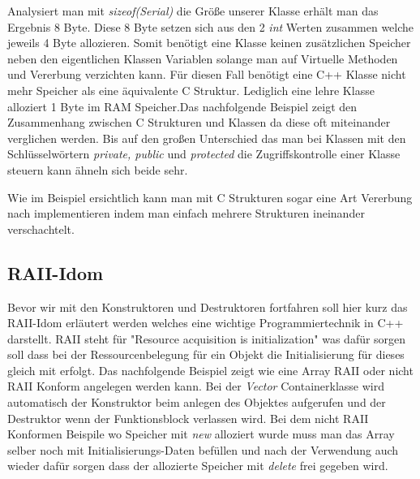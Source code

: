 \documentclass[MES,Master,ngerman]{twbook}%
\begin{document}
Analysiert man mit \textit{sizeof(Serial)} die Größe unserer Klasse erhält man das Ergebnis 8 Byte. Diese 8 Byte setzen sich aus den 2 \textit{int} Werten zusammen welche jeweils 4 Byte allozieren. Somit benötigt eine Klasse keinen zusätzlichen Speicher neben den eigentlichen Klassen Variablen solange man auf Virtuelle Methoden und Vererbung verzichten kann. Für diesen Fall benötigt eine C++ Klasse nicht mehr Speicher als eine äquivalente C Struktur. Lediglich eine lehre Klasse alloziert 1 Byte im RAM Speicher.\newpage Das nachfolgende Beispiel zeigt den Zusammenhang zwischen C Strukturen und Klassen da diese oft miteinander verglichen werden. Bis auf den großen Unterschied das man bei Klassen mit den Schlüsselwörtern \textit{private, public} und \textit{protected} die Zugriffskontrolle einer Klasse steuern kann ähneln sich beide sehr.

\begin{figure}[!htb]
	\begin{subfigure}[b]{0.5\textwidth}
		
		\label{fig:21}
	\end{subfigure}
	\begin{subfigure}[b]{0.5\textwidth}
		
		\label{fig:22}
	\end{subfigure}
\end{figure}

Wie im Beispiel ersichtlich kann man mit C Strukturen sogar eine Art Vererbung nach implementieren indem man einfach mehrere Strukturen ineinander verschachtelt.

\subsection{RAII-Idom}
Bevor wir mit den Konstruktoren und Destruktoren fortfahren soll hier kurz das RAII-Idom erläutert werden welches eine wichtige Programmiertechnik in C++ darstellt. RAII steht für "Resource acquisition is initialization" \space  was dafür sorgen soll dass bei der Ressourcenbelegung für ein Objekt die Initialisierung für dieses gleich mit erfolgt. Das nachfolgende Beispiel zeigt wie eine Array RAII oder nicht RAII Konform angelegen werden kann. Bei der \textit{Vector} Containerklasse wird automatisch der Konstruktor beim anlegen des Objektes aufgerufen und der Destruktor wenn der Funktionsblock verlassen wird. Bei dem nicht RAII Konformen Beispile wo Speicher mit \textit{new} alloziert wurde muss man das Array selber noch mit Initialisierungs-Daten befüllen und nach der Verwendung auch wieder dafür sorgen dass der allozierte Speicher mit \textit{delete} frei gegeben wird.
\end{document}
